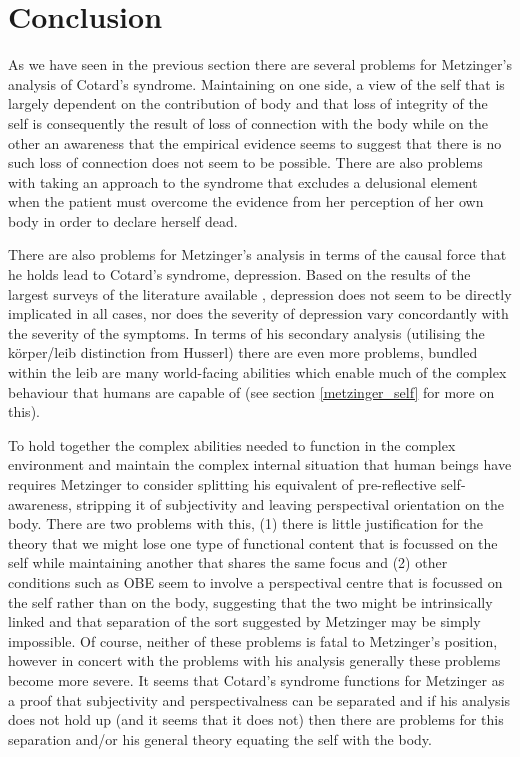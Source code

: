 \chapter{Conclusion}
\label{chap:conclusion}

As we have seen in the previous section there are several problems for Metzinger's analysis of Cotard's syndrome.
Maintaining on one side, a view of the self that is largely dependent on the contribution of body and that loss of integrity of the self is consequently the result of loss of connection with the body while on the other an awareness that the empirical evidence seems to suggest that there is no such loss of connection does not seem to be possible.
There are also problems with taking an approach to the syndrome that excludes a delusional element when the patient must overcome the evidence from her perception of her own body in order to declare herself dead.

There are also problems for Metzinger's analysis in terms of the causal force that he holds lead to Cotard's syndrome, depression.
Based on the results of the largest surveys of the literature available \cite{berrios1995b}\cite{enoch1991}, depression does not seem to be directly implicated in all cases, nor does the severity of depression vary concordantly with the severity of the symptoms.
In terms of his secondary analysis (utilising the k\"{o}rper/leib distinction from Husserl) there are even more problems, bundled within the leib are many world-facing abilities which enable much of the complex behaviour that humans are capable of (see section \ref{metzinger_self} for more on this).

To hold together the complex abilities needed to function in the complex environment and maintain the complex internal situation that human beings have requires Metzinger to consider splitting his equivalent of pre-reflective self-awareness, stripping it of subjectivity and leaving perspectival orientation on the body.
There are two problems with this, (1) there is little justification for the theory that we might lose one type of functional content that is focussed on the self while maintaining another that shares the same focus and (2) other conditions such as OBE seem to involve a perspectival centre that is focussed on the self rather than on the body, suggesting that the two might be intrinsically linked and that separation of the sort suggested by Metzinger may be simply impossible.
Of course, neither of these problems is fatal to Metzinger's position, however in concert with the problems with his analysis generally these problems become more severe.
It seems that Cotard's syndrome functions for Metzinger as a proof that subjectivity and perspectivalness can be separated and if his analysis does not hold up (and it seems that it does not) then there are problems for this separation and/or his general theory equating the self with the body.

